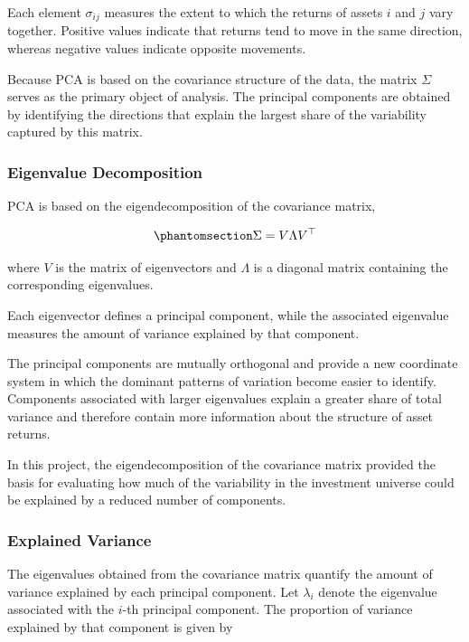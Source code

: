 \documentclass[
  12pt,
  letterpaper,
]{book}
\begin{document}
Each element \(\sigma_{ij}\) measures the extent to which the returns of
assets \(i\) and \(j\) vary together. Positive values indicate that
returns tend to move in the same direction, whereas negative values
indicate opposite movements.

Because PCA is based on the covariance structure of the data, the matrix
\(\Sigma\) serves as the primary object of analysis. The principal
components are obtained by identifying the directions that explain the
largest share of the variability captured by this matrix.

\subsubsection{Eigenvalue Decomposition}\label{eigenvalue-decomposition}

PCA is based on the eigendecomposition of the covariance matrix,

\begin{equation}\phantomsection\label{eq-eigendecomposition}{
\Sigma = V \Lambda V^\top
}\end{equation}

where \(V\) is the matrix of eigenvectors and \(\Lambda\) is a diagonal
matrix containing the corresponding eigenvalues.

Each eigenvector defines a principal component, while the associated
eigenvalue measures the amount of variance explained by that component.

The principal components are mutually orthogonal and provide a new
coordinate system in which the dominant patterns of variation become
easier to identify. Components associated with larger eigenvalues
explain a greater share of total variance and therefore contain more
information about the structure of asset returns.

In this project, the eigendecomposition of the covariance matrix
provided the basis for evaluating how much of the variability in the
investment universe could be explained by a reduced number of
components.

\subsubsection{Explained Variance}\label{explained-variance}

The eigenvalues obtained from the covariance matrix quantify the amount
of variance explained by each principal component. Let \(\lambda_i\)
denote the eigenvalue associated with the \(i\)-th principal component.
The proportion of variance explained by that component is given by
\end{document}

